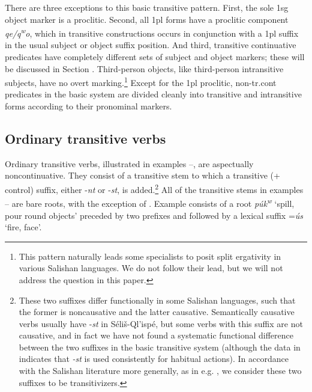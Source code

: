 \documentclass[output=paper,colorlinks,citecolor=brown]{langscibook}
\begin{document}
There are three exceptions to this basic transitive pattern.  First,
the sole 1sg object marker is a proclitic.  Second, all 1pl forms have
a proclitic component \emph{qe/{q\textsuperscript w}o}, which in
transitive constructions occurs in conjunction with a 1pl suffix in the
usual subject or object suffix position.  And third, transitive
continuative predicates have completely different sets of subject and
object markers; these will be discussed in Section .  Third-person
objects, like third-person intransitive subjects, have no overt
marking.\footnote{This pattern naturally leads some specialists to
posit split ergativity in various Salishan languages.  We do not
follow their lead, but we will not address the question in this
paper.}  Except for the 1pl proclitic, non-tr.cont predicates in
the basic system are divided cleanly into transitive and intransitive
forms according to their pronominal markers.

\subsection{Ordinary transitive verbs}  %
\label{thomason_section_2.1}

  Ordinary transitive verbs, illustrated in examples --, are aspectually
  noncontinuative.  They consist of a transitive stem to which a
  transitive (+ control) suffix, either -\emph{nt} or -\emph{st}, is
  added.\footnote{These two suffixes differ functionally in some
  Salishan languages, such that the former is noncausative and the
  latter causative.  Semantically causative verbs usually have
  -\emph{st} in S\'eli\v{s}-Ql'isp\'e, but some verbs with this
  suffix are not causative, and in fact we have not found a
  systematic functional difference between the two suffixes in the
  basic transitive system (although the data in
   indicates that \emph{-st} is used
  consistently for habitual actions). In accordance with the Salishan
  literature more generally, as in
  e.g. , we consider these
  two suffixes to be transitivizers.}  All of the transitive stems in
  examples -- are bare roots, with the exception of .  Example  consists
  of a root \emph{p\'uk\textsuperscript w} `spill, pour round
  objects' preceded by two prefixes and followed by a lexical suffix
  =\emph{\'us} `fire, face'.
\end{document}
